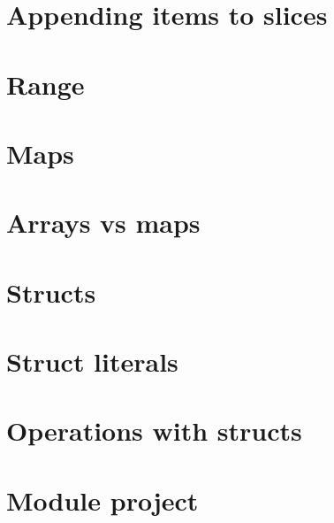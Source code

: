 \documentclass[]{book}
\begin{document}
\hypertarget{appending-items-to-slices}{%
\section{Appending items to slices}\label{appending-items-to-slices}}

\hypertarget{range}{%
\section{Range}\label{range}}

\hypertarget{maps}{%
\section{Maps}\label{maps}}

\hypertarget{arrays-vs-maps}{%
\section{Arrays vs maps}\label{arrays-vs-maps}}

\hypertarget{structs}{%
\section{Structs}\label{structs}}

\hypertarget{struct-literals}{%
\section{Struct literals}\label{struct-literals}}

\hypertarget{operations-with-structs}{%
\section{Operations with structs}\label{operations-with-structs}}

\hypertarget{module-project-2}{%
\section*{Module project}\label{module-project-2}}
\end{document}
